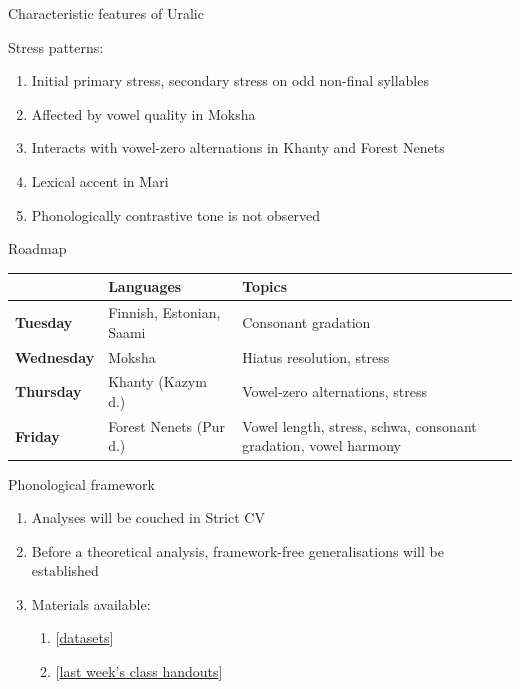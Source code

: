 \documentclass[10 pt, handout]{beamer}
\begin{document}
\begin{frame}{Characteristic features of Uralic}

	Stress patterns:
	
	\begin{enumerate}[$\gg$]
		\item Initial primary stress, secondary stress on odd non-final syllables
		\item Affected by vowel quality in Moksha
		\item Interacts with vowel-zero alternations in Khanty and Forest Nenets
		\item Lexical accent in Mari
		\item Phonologically contrastive tone is not observed
	\end{enumerate}

\end{frame}

\begin{frame}{Roadmap}

\begin{table}[]
\begin{tabular}{llp{}}
\toprule
          & \textbf{Languages}                   & \textbf{Topics}                                           \\
          \midrule
\textbf{Tuesday}   & Finnish, Estonian, Saami    & Consonant gradation                              \\
\addlinespace[0.2cm]
\textbf{Wednesday} & Moksha                      & Hiatus resolution, stress                        \\
\addlinespace[0.2cm]
\textbf{Thursday}  & Khanty (Kazym d.)      & Vowel-zero alternations, stress                  \\
\addlinespace[0.2cm]
\textbf{Friday}    & Forest Nenets (Pur d.) & Vowel length, stress, schwa, consonant gradation, vowel harmony \\
\bottomrule
\end{tabular}
\end{table}
\end{frame}

\begin{frame}{Phonological framework}

	\begin{enumerate}[$\gg$]
		\item Analyses will be couched in Strict CV
		\item Before a theoretical analysis, framework-free generalisations will be established
		\item Materials available:
			\begin{enumerate}[$\cdot$]
			\normalsize
			\setlength\itemsep{0em}
				\item {[\href{link}{datasets}]}
				\item {[\href{link}{last week's class handouts}]}
			\end{enumerate}
	\end{enumerate}

\end{frame}
\end{document}

